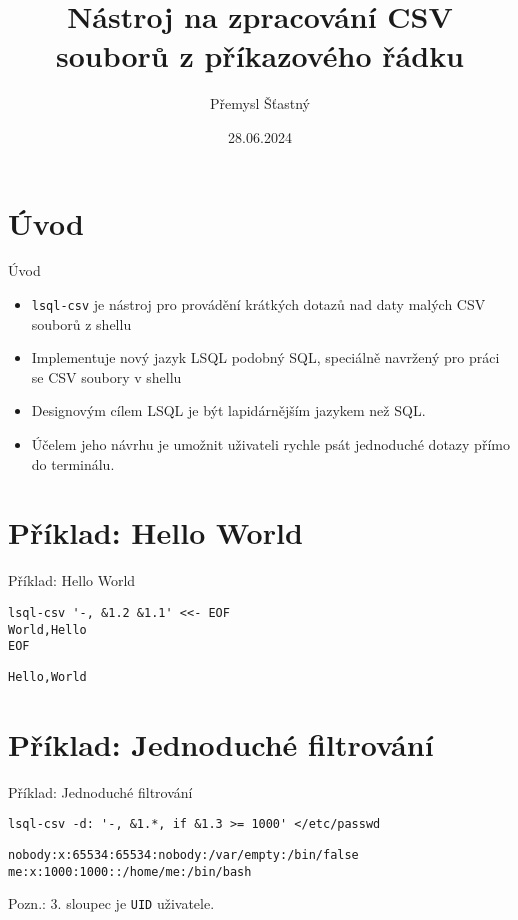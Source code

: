 \documentclass{beamer}
\title[Nástroj \icode{lsql-csv} na zpracování CSV souborů z příkazového řádku]{Nástroj \icode{lsql-csv} na zpracování CSV souborů z příkazového řádku}
\author{Přemysl Šťastný}
\institute{Univerzita Karlova}
\date{28.06.2024}
\def\icode#1{\texttt{#1}}
\begin{document}
\begin{frame}
  \titlepage
\end{frame}


\section{Úvod}

\begin{frame}{Úvod}

\begin{itemize}
  \item \icode{lsql-csv} je nástroj pro provádění krátkých dotazů nad daty malých CSV souborů z shellu
  \item Implementuje nový jazyk LSQL podobný SQL, speciálně navržený pro práci se CSV soubory v shellu
  \item Designovým cílem LSQL je být lapidárnějším jazykem než SQL. 
  \item Účelem jeho návrhu je umožnit uživateli rychle psát jednoduché dotazy přímo do terminálu.
\end{itemize}


\end{frame}


\section{Příklad: Hello World}

\begin{frame}[fragile]{Příklad: Hello World}

\begin{verbatim}
lsql-csv '-, &1.2 &1.1' <<- EOF
World,Hello
EOF
\end{verbatim}

\begin{verbatim}
Hello,World
\end{verbatim}

\end{frame}

\section{Příklad: Jednoduché filtrování}
\begin{frame}[fragile]{Příklad: Jednoduché filtrování}

\begin{verbatim}
lsql-csv -d: '-, &1.*, if &1.3 >= 1000' </etc/passwd
\end{verbatim}

\begin{verbatim}
nobody:x:65534:65534:nobody:/var/empty:/bin/false
me:x:1000:1000::/home/me:/bin/bash
\end{verbatim}

\vskip 1cm

Pozn.: 3. sloupec je \icode{UID} uživatele.

\end{frame}
\end{document}
